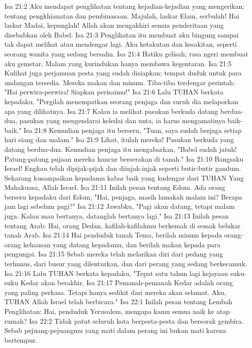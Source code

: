 Isa 21:2  Aku mendapat penglihatan tentang kejadian-kejadian yang mengerikan; tentang pengkhianatan dan pembinasaan. Majulah, laskar Elam, serbulah! Hai laskar Madai, kepunglah! Allah akan mengakhiri semua penderitaan yang disebabkan oleh Babel.
Isa 21:3  Penglihatan itu membuat aku bingung sampai tak dapat melihat atau mendengar lagi. Aku ketakutan dan kesakitan, seperti seorang wanita yang sedang bersalin.
Isa 21:4  Hatiku gelisah; rasa ngeri membuat aku gemetar. Malam yang kurindukan hanya membawa kegentaran.
Isa 21:5  Kulihat juga perjamuan pesta yang sudah disiapkan; tempat duduk untuk para undangan tersedia. Mereka makan dan minum. Tiba-tiba terdengar perintah: "Hai perwira-perwira! Siapkan perisaimu!"
Isa 21:6  Lalu TUHAN berkata kepadaku, "Pergilah menempatkan seorang penjaga dan suruh dia melaporkan apa yang dilihatnya.
Isa 21:7  Kalau ia melihat pasukan berkuda datang berdua-dua, pasukan yang mengendarai keledai dan unta, ia harus mengamatinya baik-baik."
Isa 21:8  Kemudian penjaga itu berseru, "Tuan, saya sudah berjaga setiap hari siang dan malam."
Isa 21:9  Lihat, itulah mereka! Pasukan berkuda yang datang berdua-dua. Kemudian penjaga itu mengabarkan, "Babel sudah jatuh! Patung-patung pujaan mereka hancur berserakan di tanah."
Isa 21:10  Bangsaku Israel! Engkau telah dipijak-pijak dan diinjak-injak seperti butir-butir gandum. Sekarang kusampaikan kepadamu kabar baik yang kudengar dari TUHAN Yang Mahakuasa, Allah Israel.
Isa 21:11  Inilah pesan tentang Edom. Ada orang berseru kepadaku dari Edom, "Hai, penjaga, masih lamakah malam ini? Berapa jam lagi sebelum pagi?"
Isa 21:12  Jawabku, "Pagi akan datang, tetapi malam juga. Kalau mau bertanya, datanglah bertanya lagi."
Isa 21:13  Inilah pesan tentang Arab: Hai, orang Dedan, kafilah-kafilahmu berkemah di semak belukar tanah Arab.
Isa 21:14  Hai penduduk tanah Tema, berilah minum kepada orang-orang kehausan yang datang kepadamu, dan berilah makan kepada para pengungsi.
Isa 21:15  Sebab mereka telah melarikan diri dari pedang yang terhunus, dari busur yang dilenturkan, dan dari perang yang sedang berkecamuk.
Isa 21:16  Lalu TUHAN berkata kepadaku, "Tepat satu tahun lagi kejayaan suku-suku Kedar akan berakhir.
Isa 21:17  Pemanah-pemanah Kedar adalah orang yang paling perkasa. Tetapi hanya sedikit dari mereka akan selamat. Aku, TUHAN Allah Israel telah berbicara."
Isa 22:1  Inilah pesan tentang Lembah Penglihatan: Hai, penduduk Yerusalem, mengapa kamu semua naik ke atap rumah?
Isa 22:2  Tidak patut seluruh kota berpesta-pesta dan bersorak gembira. Sebab pejuang-pejuangmu yang mati dalam perang ini bukan mati karena bertempur.
